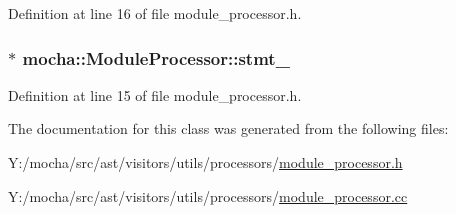 Definition at line 16 of file module\_\-processor.h.

\hypertarget{classmocha_1_1_module_processor_afe48846f9b466bacd4f340d71fa0457e}{
\subsubsection[{stmt\_\-}]{$\ast$ {\bf mocha::ModuleProcessor::stmt\_\-}}}
\label{classmocha_1_1_module_processor_afe48846f9b466bacd4f340d71fa0457e}


Definition at line 15 of file module\_\-processor.h.



The documentation for this class was generated from the following files:\begin{DoxyCompactItemize}
\item 
Y:/mocha/src/ast/visitors/utils/processors/\hyperlink{module__processor_8h}{module\_\-processor.h}\item 
Y:/mocha/src/ast/visitors/utils/processors/\hyperlink{module__processor_8cc}{module\_\-processor.cc}\end{DoxyCompactItemize}
